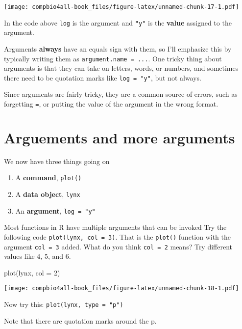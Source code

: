 \documentclass[
]{book}
\newenvironment{Shaded}{\begin{snugshade}}{\end{snugshade}}
\newcommand{\AttributeTok}[1]{\textcolor[rgb]{0.77,0.63,0.00}{#1}}
\newcommand{\DecValTok}[1]{\textcolor[rgb]{0.00,0.00,0.81}{#1}}
\newcommand{\FunctionTok}[1]{\textcolor[rgb]{0.00,0.00,0.00}{#1}}
\newcommand{\NormalTok}[1]{#1}
\providecommand{\tightlist}{%
  \setlength{\itemsep}{0pt}\setlength{\parskip}{0pt}}
\begin{document}
\texttt{[image: compbio4all-book\_files/figure-latex/unnamed-chunk-17-1.pdf]}

In the code above \texttt{log} is the argument and \texttt{"y"} is the \textbf{value} assigned to the argument.

Arguments \textbf{always} have an equals sign with them, so I'll emphasize this by typically writing them as \texttt{argument.name\ =\ ...}. One tricky thing about arguments is that they can take on letters, words, or numbers, and sometimes there need to be quotation marks like \texttt{log\ =\ "y"}, but not always.

Since arguments are fairly tricky, they are a common source of errors, such as forgetting \texttt{=}, or putting the value of the argument in the wrong format.

\hypertarget{arguements-and-more-arguments}{%
\section{Arguements and more arguments}\label{arguements-and-more-arguments}}

We now have three things going on

\begin{enumerate}
\def\labelenumi{\arabic{enumi}.}
\tightlist
\item
  A \textbf{command}, \texttt{plot()}
\item
  A \textbf{data object}, \texttt{lynx}
\item
  An \textbf{argument}, \texttt{log\ =\ "y"}
\end{enumerate}

Most functions in R have multiple arguments that can be invoked Try the following code \texttt{plot(lynx,\ col\ =\ 3)}. That is the \texttt{plot()} function with the argument \texttt{col\ =\ 3} added. What do you think \texttt{col\ =\ 2} means? Try different values like 4, 5, and 6.

\begin{Shaded}
\begin{Highlighting}[]
\FunctionTok{plot}\NormalTok{(lynx, }\AttributeTok{col =} \DecValTok{2}\NormalTok{)}
\end{Highlighting}
\end{Shaded}

\texttt{[image: compbio4all-book\_files/figure-latex/unnamed-chunk-18-1.pdf]}

Now try this: \texttt{plot(lynx,\ type\ =\ "p")}

Note that there are quotation marks around the p.
\end{document}
